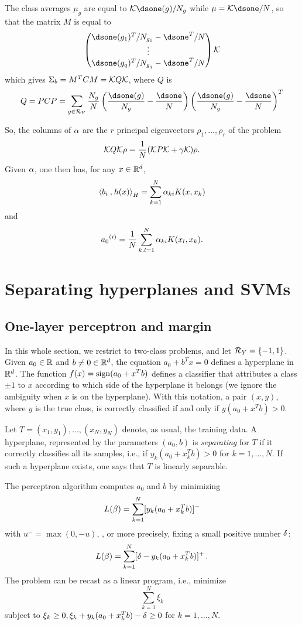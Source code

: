 The class averages $\mu_g$ are equal to $\CK \dsone(g)/N_g$ while $\mu = \CK \dsone/N$, so that the matrix $M$ is equal to 
\[
\begin{pmatrix}
\dsone(g_1)^T/N_{g_1} - \dsone^T/N \\
\vdots\\
\dsone(g_q)^T/N_{g_q} - \dsone^T/N
\end{pmatrix}
\CK
\]
which gives $\Sigma_b = M^T C M = {\mathcal K} Q {\mathcal K}$, where $Q$ is
\[
Q = PCP = \sum_{g\in \CR_Y} \frac{N_g}{N} \left(\frac{\dsone(g)}{N_g} - \frac{\dsone}N\right) \left(\frac{\dsone(g)}{N_g} - \frac{\dsone}N\right)^T \]

So, the columns of $\alpha$ are the $r$ principal eigenvectors $\rho_1, \ldots, \rho_r$ of the problem 
\[
{\mathcal K} Q {\mathcal K} \rho = \frac1 N ({\mathcal K} P {\mathcal K} + \gamma {\mathcal K}) \rho.
\]
Given $\alpha$, one then has, for any $x\in {\mathbb{R}}^d$, 
\[
{\langle {b_i}\mathbin{,} {h(x)}\rangle}_H = \sum_{k=1}^N \alpha_{ki} K(x,x_k)
\]
and
\[
{a_0}^{(i)} = \frac{1}{N} \sum_{k,l=1}^N \alpha_{ki} K(x_l, x_k).
\]




\section{Separating hyperplanes and SVMs}

\subsection{One-layer perceptron and margin}
In this whole section, we restrict to  two-class problems, and let ${\mathcal R}_Y =
\left\{ -1,1 \right\}$. 
 Given ${a_0}\in {\mathbb{R}}$ and $b \neq 0 \in {\mathbb{R}}^d$, the equation  ${a_0} + b^T x = 0$ defines a hyperplane in ${\mathbb{R}}^d$.
 The function $f(x) = \operatorname{sign}({a_0} + x^T b)$ defines a classifier that attributes a class $\pm1$ to $x$ according to which side of the hyperplane it belongs (we ignore the ambiguity when $x$ is on the hyperplane).
With this
notation, a pair $(x, y)$, where $y$ is the true class, is correctly classified if and only if
$y({a_0} + x^T b) > 0$.

Let $T = (x_1,
y_1), \ldots, (x_N, y_N)$ denote, as usual, the training data. A hyperplane, represented by the parameters $({a_0}, b)$ is {\em separating} for $T$ if it correctly classifies all its samples, i.e., if $y_k({a_0} + x_k^T b) > 0$ for $k=1, \ldots, N$. If such a hyperplane exists, one says that $T$ is linearly separable. 
\medskip

The perceptron algorithm computes ${a_0}$ and $b$ by minimizing 
$$
L(\beta) = \sum_{k=1}^N [y_k({a_0} + x_k^T b)]^-
$$
with $u^- = \max(0, -u)$, , or more precisely, fixing a small positive number $\delta$:
\[
L(\beta) = \sum_{k=1}^N [\delta - y_k({a_0} + x_k^T b)]^+\,.
\]
The problem can be recast as a linear program, i.e., minimize
\[
\sum_{k=1}^N \xi_k
\]
subject to $\xi_k\geq 0, \xi_k + y_k({a_0} + x_k^Tb) -\delta \geq
0$ for $k=1, \ldots, N$.



